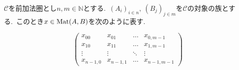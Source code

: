 \begin{definition} \label{def: matrixNotation}
$\mathscr{C}$を前加法圏とし$n,m \in \mathbb{N}$とする.\
$(A_i)_{i \in n},\ (B_j)_{j \in m}$を$\mathscr{C}$の対象の族とする.\
このとき$x \in \operatorname{Mat}(A,B)$を次のように表す.
\begin{center}
\[
\begin{pmatrix} 
  x_{00} & x_{01} & \dots  & x_{0,m-1} \\
  x_{10} & x_{11} & \dots  & x_{1,m-1} \\
  \vdots & \vdots & \ddots & \vdots \\
  x_{n-1,0} & x_{n-1,1} & \dots  & x_{n-1,m-1}
\end{pmatrix}
\]
\end{center}
\end{definition}
